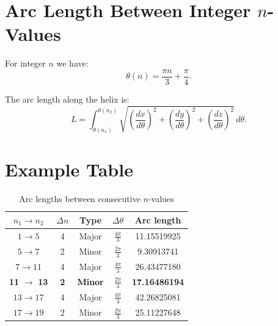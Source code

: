 \section{Arc Length Between Integer \texorpdfstring{$n$}{n}-Values}

For integer $n$ we have:
\begin{equation}
\theta(n) = \frac{\pi n}{3} + \frac{\pi}{4}.
\end{equation}

The arc length along the helix is:
\begin{equation}
L = \int_{\theta(n_1)}^{\theta(n_2)}
\sqrt{
\left(\frac{dx}{d\theta}\right)^2
+
\left(\frac{dy}{d\theta}\right)^2
+
\left(\frac{dz}{d\theta}\right)^2
}\, d\theta.
\end{equation}

\section{Example Table}

\begin{table}[ht]
\centering
\caption{Arc lengths between consecutive $n$-values}
\begin{tabular}{ccccc}
\toprule
$n_1 \to n_2$ & $\Delta n$ & Type & $\Delta\theta$ & Arc length \\
\midrule
$1 \to 5$ & 4 & Major & $\frac{4\pi}{3}$ & 11.15519925 \\
$5 \to 7$ & 2 & Minor & $\frac{2\pi}{3}$ & 9.30913741 \\
$7 \to 11$ & 4 & Major & $\frac{4\pi}{3}$ & 26.43477180 \\
\rowcolor{yellow!30}
\textbf{11} $\to$ \textbf{13} & \textbf{2} & \textbf{Minor} & $\frac{2\pi}{3}$ & \textbf{17.16486194} \\
$13 \to 17$ & 4 & Major & $\frac{4\pi}{3}$ & 42.26825081 \\
$17 \to 19$ & 2 & Minor & $\frac{2\pi}{3}$ & 25.11227648 \\
\bottomrule
\end{tabular}
\end{table}

